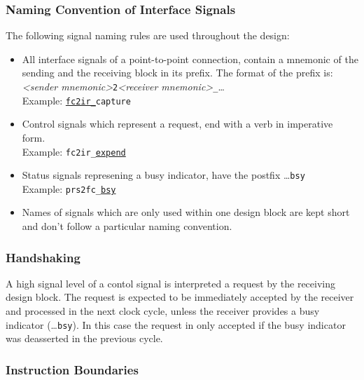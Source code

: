 \subsubsection{Naming Convention of Interface Signals}
\label{architecture:principles:naming}

The following signal naming rules are used throughout the design:
\begin{itemize}

\item   
All interface signals of a point-to-point connection, contain a mnemonic of the sending and the receiving block in its prefix.
The format of the prefix is: \\
\emph{\textless sender mnemonic\textgreater}\texttt{2}\emph{\textless receiver mnemonic\textgreater }\texttt{\_}\dots \\
Example: \texttt{\underline{fc2ir\_}capture}

\item   
Control signals which represent a request, end with a verb in imperative form. \\
Example: \texttt{fc2ir\_\underline{expend}}

\item   
Status signals represening a busy indicator, have the postfix \dots\texttt{bsy} \\
  
Example: \texttt{prs2fc\_\underline{bsy}}

\item   
Names of signals which are only used within one design block are kept short and don't follow a particular naming convention.

\end{itemize}

\subsubsection{Handshaking}
\label{architecture:principles:handshakes}

A high signal level of a contol signal is interpreted a request by the receiving design block.
The request is expected to be immediately accepted by the receiver and processed in the next clock cycle,
unless the receiver provides a busy indicator (\dots\texttt{bsy}).
In this case the request in only accepted if the busy indicator was deasserted in the previous cycle.

\subsubsection{Instruction Boundaries}
\label{architecture:principles:ibounds}


